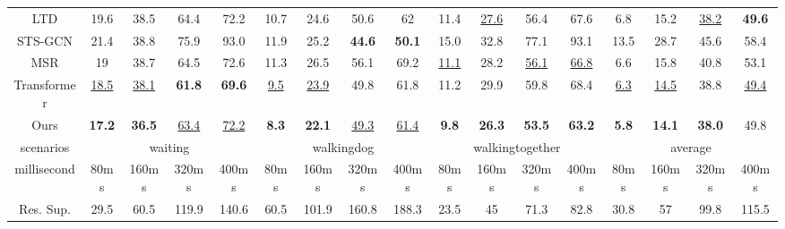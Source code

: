\begin{table*}[h]
{\begin{tabular}{c|cccc|cccc|cccc|cccc}
LTD   & 19.6          & 38.5          & 64.4          & 72.2          & 10.7          & 24.6          & 50.6          & 62             & 11.4          & \underline{27.6}          & 56.4          & 67.6          & 6.8           & 15.2          & \underline{38.2}          & \textbf{49.6}          \\
STS-GCN       & 21.4          & 38.8          & 75.9          & 93.0          & 11.9          & 25.2          & \textbf{44.6}          & \textbf{50.1}           & 15.0          & 32.8          & 77.1          & 93.1          & 13.5          & 28.7          & 45.6          & 58.4          \\
MSR   & 19            & 38.7          & 64.5          & 72.6          & 11.3          & 26.5          & 56.1          & 69.2           & \underline{11.1}          & 28.2          & \underline{56.1}          & \underline{66.8}          & 6.6           & 15.8          & 40.8          & 53.1          \\
Transformer & \underline{18.5}          & \underline{38.1}          & \textbf{61.8} & \textbf{69.6} & \underline{9.5}           & \underline{23.9}          & 49.8          & 61.8           & 11.2          & 29.9          & 59.8          & 68.4          & \underline{6.3}           & \underline{14.5}          & 38.8          & \underline{49.4}          \\
Ours   & \textbf{17.2} & \textbf{36.5} & \underline{63.4}          & \underline{72.2}          & \textbf{8.3}  & \textbf{22.1} & \underline{49.3} & \underline{61.4}  & \textbf{9.8}  & \textbf{26.3} & \textbf{53.5} & \textbf{63.2} & \textbf{5.8}  & \textbf{14.1} & \textbf{38.0} & 49.8 \\ \hline
scenarios   & \multicolumn{4}{c|}{waiting}                                   & \multicolumn{4}{c|}{walkingdog}                                 & \multicolumn{4}{c|}{walkingtogether}                           & \multicolumn{4}{c}{average}                                       \\ \hline
millisecond & 80ms          & 160ms         & 320ms         & 400ms         & 80ms          & 160ms         & 320ms         & 400ms          & 80ms          & 160ms         & 320ms         & 400ms         & 80ms          & 160ms         & 320ms         & 400ms         \\ \hline
Res. Sup.   & 29.5          & 60.5          & 119.9         & 140.6         & 60.5          & 101.9         & 160.8         & 188.3          & 23.5          & 45            & 71.3          & 82.8          & 30.8          & 57            & 99.8          & 115.5         \\

\end{tabular}}
\end{table*}
